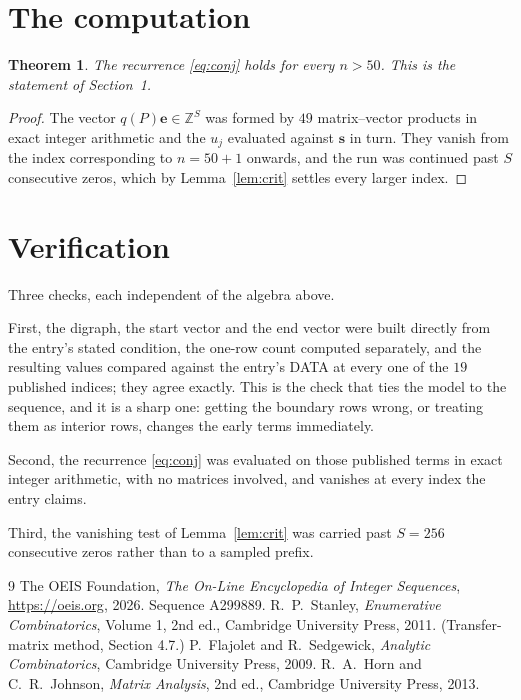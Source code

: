 \documentclass[11pt,a4paper]{article}
\theoremstyle{plain}
\newtheorem{theorem}{Theorem}
\theoremstyle{definition}
\begin{document}
\section{The computation}

\begin{theorem}
The recurrence \eqref{eq:conj} holds for every $n>50$. This is the statement of
Section~1.
\end{theorem}

\begin{proof}
The vector $q(P)\mathbf{e}\in\mathbb{Z}^{S}$ was formed by $49$ matrix--vector
products in exact integer arithmetic and the $u_j$ evaluated against $\mathbf{s}$ in turn.
They vanish from the index corresponding to $n=50+1$ onwards, and the run was continued
past $S$ consecutive zeros, which by Lemma~\ref{lem:crit} settles every larger index.
\end{proof}

\section{Verification}

Three checks, each independent of the algebra above.

First, the digraph, the start vector and the end vector were built directly from the
entry's stated condition, the one-row count computed separately, and the resulting values
compared against the entry's DATA at every one of the $19$ published indices; they
agree exactly. This is the check that ties the model to the sequence, and it is a sharp one:
getting the boundary rows wrong, or treating them as interior rows, changes the early terms
immediately.

Second, the recurrence \eqref{eq:conj} was evaluated on those published terms in exact
integer arithmetic, with no matrices involved, and vanishes at every index the entry claims.

Third, the vanishing test of Lemma~\ref{lem:crit} was carried past $S=256$ consecutive
zeros rather than to a sampled prefix.

\begin{thebibliography}{9}
 The OEIS Foundation, \emph{The On-Line Encyclopedia of Integer
Sequences}, \url{https://oeis.org}, 2026. Sequence A299889.
 R.~P.~Stanley, \emph{Enumerative Combinatorics}, Volume 1, 2nd ed.,
Cambridge University Press, 2011. (Transfer-matrix method, Section 4.7.)
 P.~Flajolet and R.~Sedgewick, \emph{Analytic Combinatorics}, Cambridge
University Press, 2009.
 R.~A.~Horn and C.~R.~Johnson, \emph{Matrix Analysis}, 2nd ed., Cambridge
University Press, 2013.
\end{thebibliography}
\end{document}
